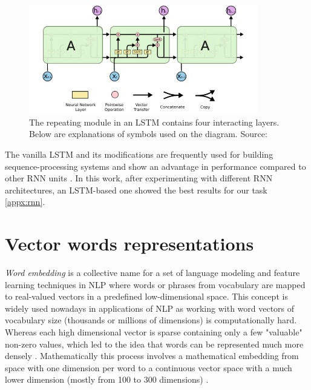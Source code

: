 \begin{figure}[h]
    \centering
    \includegraphics[width=10cm]{Images/lstm.png}
    \caption{The repeating module in an LSTM contains four interacting layers. Below are explanations of symbols used on the diagram. Source: \citep{Olah-2015}}
    \label{fig:lstm}
\end{figure} 

The vanilla LSTM and its modifications are frequently used for building sequence-processing systems and show an advantage in performance compared to other RNN units \citep{Hochreiter-1997}.
In this work, after experimenting with different RNN architectures, an LSTM-based one showed the best results for our task \ref{appx:rnn}. 

\section{Vector words representations}

\textit{Word embedding} is a collective name for a set of language modeling and feature learning techniques in NLP where words or phrases from vocabulary are mapped to real-valued vectors in a predefined low-dimensional space. This concept is widely used nowadays in applications of NLP as working with word vectors of vocabulary size (thousands or millions of dimensions) is computationally hard. Whereas each high dimensional vector is sparse containing only a few "valuable" non-zero values, which led to the idea that words can be represented much more densely \citep{Harris-1954}. Mathematically this process involves a mathematical embedding from space with one dimension per word to a continuous vector space with a much lower dimension (mostly from 100 to 300 dimensions) \citep{Brownlee-2017}.

